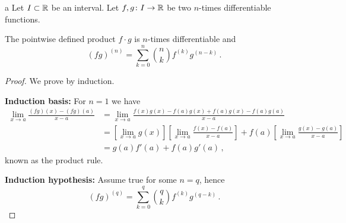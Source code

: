 \documentclass[week=6]{homework}
\date{\today}
\begin{document}
    \maketitle
    \thispagestyle{empty}
    \newpage
    \begin{questions}
		\let\firstquestion\question
		\renewcommand*{\question}{\vspace{7mm}\firstquestion}
        \firstquestion
        a
        \question
        Let $I \subset \mathbb{R}$ be an interval. Let $f,g \colon I \to \mathbb{R}$ be two $n$-times differentiable functions.
        \begin{toprove}
        	The pointwise defined product $f\cdot g$ is $n$-times differentiable and
        	\[
	        	(fg)^{(n)} = \sum_{k=0}^{n} {n\choose k} f^{(k)}g^{(n-k)}\,.
        	\]
        \end{toprove}
	    \begin{proof}
	    	We prove by induction.
	    	
	    	\textbf{Induction basis:}
	    	For $n=1$ we have
	    	\begin{align*}
	    		\lim_{x\to a} \frac{(fg)(x)-(fg)(a)}{x-a} &= \lim_{x\to a} \frac{f(x)g(x)-f(a)g(x)+f(a)g(x)-f(a)g(a)}{x-a} \\
	    		&= \left[ \lim_{x\to a}g(x) \right] \left[ \lim_{x\to a} \frac{f(x)-f(a)}{x-a} \right] + f(a) \left[ \lim_{x\to a} \frac{g(x)-g(a)}{x-a} \right] \\
	    		&= g(a)f'(a)+f(a)g'(a)\,,
	    	\end{align*}
	    	known as the product rule.
	    	
	    	\textbf{Induction hypothesis:}
	    	Assume true for some $n=q$, hence
	    	\[
		    	(fg)^{(q)} = \sum_{k=0}^{q} {q\choose k} f^{(k)}g^{(q-k)}\,.
	    	\]
	    	

\end{proof}
\end{questions}
\end{document}
